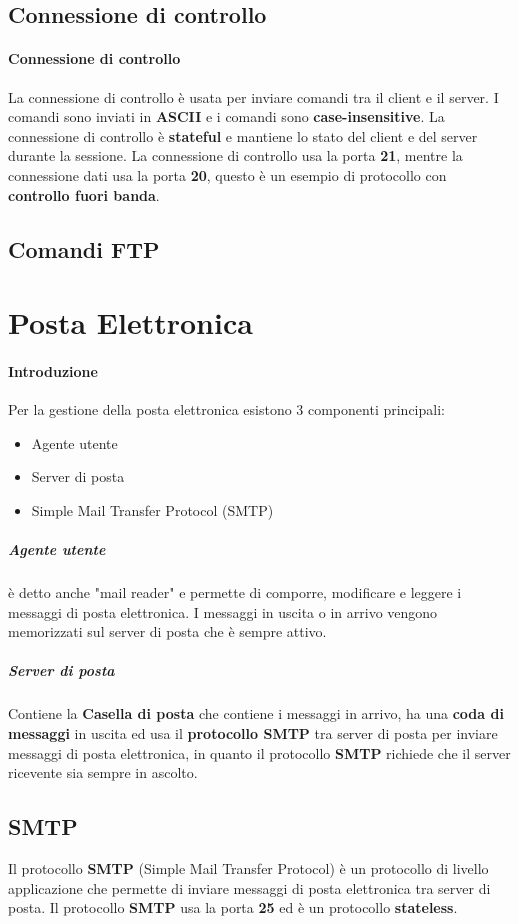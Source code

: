     \subsection{Connessione di controllo}
        \paragraph{Connessione di controllo} La connessione di controllo è usata per inviare comandi tra il client e il server. I comandi sono inviati in \textbf{ASCII} e i comandi sono \textbf{case-insensitive}. La connessione di controllo è \textbf{stateful} e mantiene lo stato del client e del server durante la sessione. La connessione di controllo usa la porta \textbf{21}, mentre la connessione dati usa la porta \textbf{20}, questo è un esempio di protocollo con \textbf{controllo fuori banda}.
    \subsection{Comandi FTP}

\section{Posta Elettronica}
    \paragraph{Introduzione}
        Per la gestione della posta elettronica esistono 3 componenti principali:
        \begin{itemize}
            \item Agente utente
            \item Server di posta
            \item Simple Mail Transfer Protocol (SMTP)
        \end{itemize}
        \subparagraph{Agente utente} è detto anche "mail reader" e permette di comporre, modificare e leggere i messaggi di posta elettronica. I messaggi in uscita o in arrivo vengono memorizzati sul server di posta che è sempre attivo.
        \subparagraph{Server di posta} Contiene la \textbf{Casella di posta} che contiene i messaggi in arrivo, ha una \textbf{coda di messaggi} in uscita ed usa il \textbf{protocollo SMTP} tra server di posta per inviare messaggi di posta elettronica, in quanto il protocollo \textbf{SMTP} richiede che il server ricevente sia sempre in ascolto.
    \subsection{SMTP}
        Il protocollo \textbf{SMTP} (Simple Mail Transfer Protocol) è un protocollo di livello applicazione che permette di inviare messaggi di posta elettronica tra server di posta. Il protocollo \textbf{SMTP} usa la porta \textbf{25} ed è un protocollo \textbf{stateless}.
